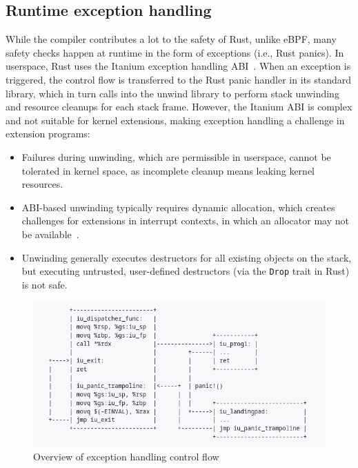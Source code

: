 \subsection{Runtime exception handling}
\label{principle:eh}
While the compiler contributes a lot to the safety of Rust, unlike eBPF, many
    safety checks happen at runtime in the form of exceptions (i.e., Rust
    panics).
In userspace, Rust uses the Itanium exception handling ABI~\cite{itanium-abi}.
When an exception is triggered, the control flow is transferred to the Rust
    panic handler in its standard library, which in turn calls into the unwind
    library to perform stack unwinding and resource cleanups for each stack
    frame.
However, the Itanium ABI is complex and not suitable for kernel extensions,
    making exception handling a challenge in \projname{} extension programs:
\begin{itemize}
    \item Failures during unwinding, which are permissible in userspace, cannot
        be tolerated in kernel space, as incomplete cleanup means leaking
        kernel resources.
    \item ABI-based unwinding typically requires dynamic allocation, which
        creates challenges for extensions in interrupt contexts, in which an
        allocator may not be available~\cite{bpf-mempool-lwn}. 
    \item Unwinding generally executes destructors for all existing objects on
        the stack, but executing untrusted, user-defined destructors (via the
        \texttt{\small Drop} trait in Rust) is not safe.
\end{itemize}

\begin{figure}
    \includegraphics[width=0.8\linewidth]{figs/EH.png}
    \centering
    \vspace{-10pt}
    \caption{Overview of exception handling control flow}
    \label{fig:eh-overview}
    \vspace{-10pt}
\end{figure}

